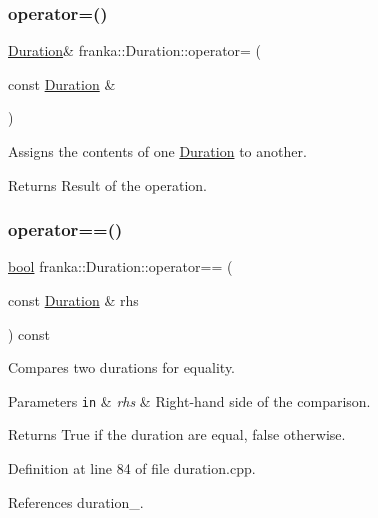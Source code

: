 \subsubsection{\texorpdfstring{operator=()}{operator=()}}
{\footnotesize\ttfamily \hyperlink{classfranka_1_1Duration}{Duration}\& franka\+::\+Duration\+::operator= (\begin{DoxyParamCaption}\item[{const \hyperlink{classfranka_1_1Duration}{Duration} \&}]{ }\end{DoxyParamCaption})\hspace{0.3cm}{\ttfamily [default]}}

Assigns the contents of one \hyperlink{classfranka_1_1Duration}{Duration} to another.

\begin{DoxyReturn}{Returns}
Result of the operation. 
\end{DoxyReturn}
\mbox{\label{classfranka_1_1Duration_add0c7bcdfe51b563016236b223d74eae}} 
\subsubsection{\texorpdfstring{operator==()}{operator==()}}
{\footnotesize\ttfamily \hyperlink{classbool}{bool} franka\+::\+Duration\+::operator== (\begin{DoxyParamCaption}\item[{const \hyperlink{classfranka_1_1Duration}{Duration} \&}]{rhs }\end{DoxyParamCaption}) const\hspace{0.3cm}{\ttfamily [noexcept]}}

Compares two durations for equality.


\begin{DoxyParams}[1]{Parameters}
\mbox{\tt in}  & {\em rhs} & Right-\/hand side of the comparison.\\
\hline
\end{DoxyParams}
\begin{DoxyReturn}{Returns}
True if the duration are equal, false otherwise. 
\end{DoxyReturn}


Definition at line 84 of file duration.\+cpp.



References duration\+\_\+.


